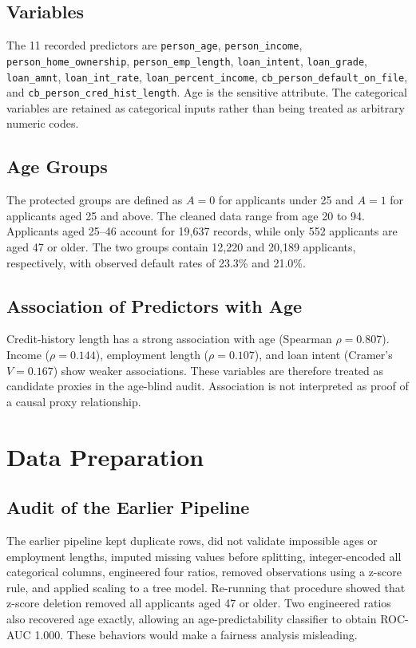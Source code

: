 \subsection{Variables}

The 11 recorded predictors are \texttt{person\_age}, \texttt{person\_income},
\texttt{person\_home\_ownership}, \texttt{person\_emp\_length},
\texttt{loan\_intent}, \texttt{loan\_grade}, \texttt{loan\_amnt},
\texttt{loan\_int\_rate}, \texttt{loan\_percent\_income},
\texttt{cb\_person\_default\_on\_file}, and
\texttt{cb\_person\_cred\_hist\_length}. Age is the sensitive attribute. The
categorical variables are retained as categorical inputs rather than being
treated as arbitrary numeric codes.

\subsection{Age Groups}

The protected groups are defined as $A=0$ for applicants under 25 and $A=1$
for applicants aged 25 and above. The cleaned data range from age 20 to 94.
Applicants aged 25--46 account for 19,637 records, while only 552 applicants
are aged 47 or older. The two groups contain 12,220 and 20,189 applicants,
respectively, with observed default rates of 23.3\% and 21.0\%.

\subsection{Association of Predictors with Age}

Credit-history length has a strong association with age (Spearman
$\rho=0.807$). Income ($\rho=0.144$), employment length ($\rho=0.107$), and
loan intent (Cramer's $V=0.167$) show weaker associations. These variables are
therefore treated as candidate proxies in the age-blind audit. Association is
not interpreted as proof of a causal proxy relationship.

\section{Data Preparation}
\label{sec:data-preparation}

\subsection{Audit of the Earlier Pipeline}

The earlier pipeline kept duplicate rows, did not validate impossible ages or
employment lengths, imputed missing values before splitting, integer-encoded all
categorical columns, engineered four ratios, removed observations using a
z-score rule, and applied scaling to a tree model. Re-running that procedure
showed that z-score deletion removed all applicants aged 47 or older. Two
engineered ratios also recovered age exactly, allowing an age-predictability
classifier to obtain ROC-AUC 1.000. These behaviors would make a fairness
analysis misleading.

